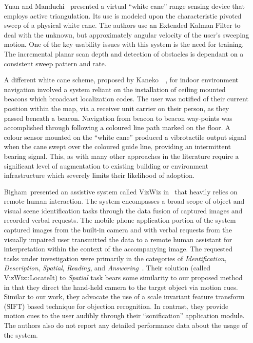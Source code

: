 Yuan and Manduchi~\cite{YUAN05} presented a virtual ``white cane'' range sensing device that employs active triangulation.  Its use is modeled upon the characteristic pivoted sweep of a physical white cane.  The authors use an Extended Kalman Filter to deal with the unknown, but approximately angular velocity of the user's sweeping motion.  One of the key usability issues with this system is the need for training.  The incremental planar scan depth and detection of obstacles is dependant on a consistent sweep pattern and rate.

A different white cane scheme, proposed by Kaneko~\etal~\cite{KANEKO03}, for indoor environment navigation involved a system reliant on the installation of ceiling mounted beacons which broadcast localization codes.  The user was notified of their current position within the map, via a receiver unit carrier on their person, as they passed beneath a beacon.  Navigation from beacon to beacon way-points was accomplished through following a coloured line path marked on the floor.  A colour sensor mounted on the ``white cane'' produced a vibrotactile output signal when the cane swept over the coloured guide line, providing an intermittent bearing signal.  This, as with many other approaches in the literature require a significant level of augmentation to existing building or environment infrastructure which severely limits their likelihood of adoption.

Bigham~\etal presented an assistive system called VizWiz in~\cite{BIGHAM10a, BIGHAM10b} that heavily relies on remote human interaction.  The system encompasses a broad scope of object and visual scene identification tasks through the data fusion of captured images and recorded verbal requests.  The mobile phone application portion of the system captured images from the built-in camera and with verbal requests from the visually impaired user transmitted the data to a remote human assistant for interpretation within the context of the accompanying image.  The requested tasks under investigation were primarily in the categories of \textit{Identification}, \textit{Description}, \textit{Spatial}, \textit{Reading}, and \textit{Answering}~\cite{BRADY11}.  Their solution (called VizWiz::LocateIt) to \textit{Spatial} task bears some similarity to our proposed method in that they direct the hand-held camera to the target object via motion cues.  Similar to our work, they advocate the use of a scale invariant feature transform (SIFT) based technique for objection recognition.  In contrast, they provide motion cues to the user audibly through their ``sonification'' application module.  The authors also do not report any detailed performance data about the usage of the system.

